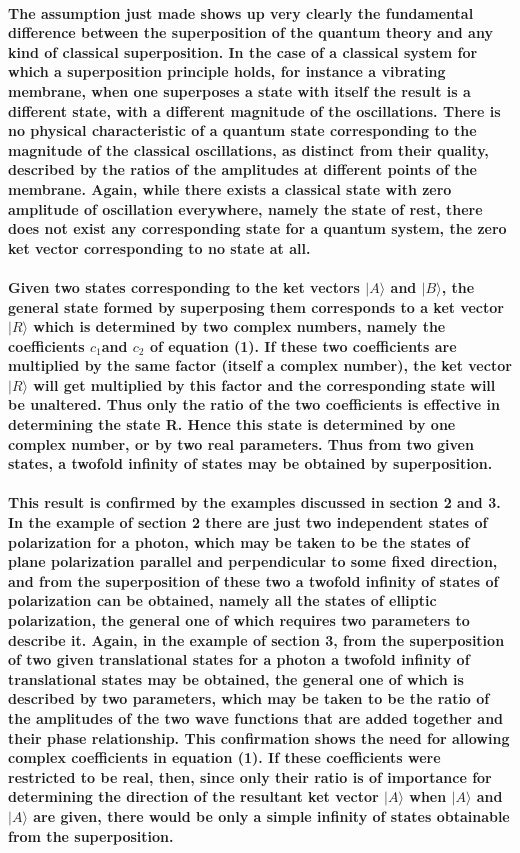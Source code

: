\documentclass[10pt, kindle, oneside]{kindle}
\begin{document}
\paragraph{The assumption just made shows up very clearly the fundamental difference between the superposition of the quantum theory and any kind of classical superposition. In the case of a classical system for which a superposition principle holds, for instance a vibrating membrane, when one superposes a state with itself the result is a different state, with a different magnitude of the oscillations. There is no physical characteristic of a quantum state corresponding to the magnitude of the classical oscillations, as distinct from their quality, described by the ratios of the amplitudes at different points of the membrane. Again, while there exists a classical state with zero amplitude of oscillation everywhere, namely the state of rest, there does not exist any corresponding state for a quantum system, the zero ket vector corresponding to no state at all.}
\paragraph{Given two states corresponding to the ket vectors $|A\rangle$ and $|B\rangle$, the general state formed by superposing them corresponds to a ket vector $|R \rangle$ which is determined by two complex numbers, namely the coefficients $c_1$and $c_2$ of equation (1). If these two coefficients are multiplied by the same factor (itself a complex number), the ket vector $|R \rangle$ will get multiplied by this factor and the corresponding state will be unaltered. Thus only the ratio of the two coefficients is effective in determining the state R. Hence this state is determined by one complex number, or by two real parameters. Thus from two given states, a twofold infinity of states may be obtained by superposition.}
\paragraph{This result is confirmed by the examples discussed in section 2 and 3. In the example of section 2 there are just two independent states of polarization for a photon, which may be taken to be the states of plane polarization parallel and perpendicular to some fixed direction, and from the superposition of these two a twofold infinity of states of polarization can be obtained, namely all the states of elliptic polarization, the general one of which requires two parameters to describe it. Again, in the example of section 3, from the superposition of two given translational states for a photon a twofold infinity of translational states may be obtained, the general one of which is described by two parameters, which may be taken to be the ratio of the amplitudes of the two wave functions that are added together and their phase relationship. This confirmation shows the need for allowing complex coefficients in equation (1). If these coefficients were restricted to be real, then, since only their ratio is of importance for determining the direction of the resultant ket vector $ |A \rangle $ when $ |A \rangle $ and $ |A \rangle $ are given, there would be only a simple infinity of states obtainable from the superposition.}
\end{document}
